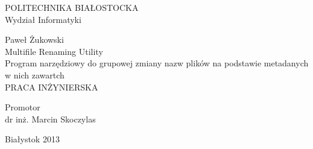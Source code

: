 \begin{titlepage}
	\begin{center}
	\vspace{3cm}
	\fontsize{25pt}{31pt}\selectfont
	POLITECHNIKA BIAŁOSTOCKA \\
	\vspace*{.5\baselineskip}
	\fontsize{24pt}{18pt}\selectfont
	Wydział Informatyki

	\vspace*{3\baselineskip}
	\fontsize{32pt}{20pt}\selectfont
	Paweł Żukowski\\
	\vspace*{\baselineskip}
	\fontsize{20pt}{15pt}\selectfont
	Multifile Renaming Utility\\
	Program narzędziowy do grupowej zmiany nazw plików na podstawie metadanych w nich zawartch\\
	\vspace*{\baselineskip}
	\fontsize{15pt}{18pt}\selectfont
	PRACA INŻYNIERSKA \\
	\end{center}
	\vspace*{\baselineskip}
	\vspace*{3\baselineskip}
	\begin{flushright}
	\fontsize{18pt}{10pt}\selectfont
	Promotor\\
	dr inż. Marcin Skoczylas\\
	\end{flushright}
	
	\vspace*{4\baselineskip}
	\begin{center}
	Białystok 2013
	\end{center}

%
%
%
%
%
%

\end{titlepage}
